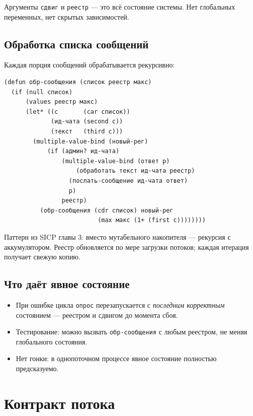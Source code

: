 \documentclass[11pt,a4paper]{article}
\begin{document}
Аргументы \texttt{сдвиг} и \texttt{реестр} — это всё состояние системы. Нет глобальных переменных, нет скрытых зависимостей.

\subsection{Обработка списка сообщений}

Каждая порция сообщений обрабатывается рекурсивно:

\begin{lstlisting}[caption={подмастерье/main.lisp — обработка с накоплением}]
(defun обр-сообщения (список реестр макс)
  (if (null список)
      (values реестр макс)
      (let* ((с       (car список))
             (ид-чата (second с))
             (текст   (third с)))
        (multiple-value-bind (новый-рег)
            (if (админ? ид-чата)
                (multiple-value-bind (ответ р)
                    (обработать текст ид-чата реестр)
                  (послать-сообщение ид-чата ответ)
                  р)
                реестр)
          (обр-сообщения (cdr список) новый-рег
                          (max макс (1+ (first с))))))))
\end{lstlisting}

Паттерн из SICP главы 3: вместо мутабельного накопителя — рекурсия с аккумулятором. Реестр обновляется по мере загрузки потоков; каждая итерация получает свежую копию.

\subsection{Что даёт явное состояние}

\begin{itemize}[noitemsep]
  \item При ошибке цикла \texttt{опрос} перезапускается с \textit{последним корректным} состоянием — реестром и сдвигом до момента сбоя.
  \item Тестирование: можно вызвать \texttt{обр-сообщения} с любым реестром, не меняя глобального состояния.
  \item Нет гонки: в однопоточном процессе явное состояние полностью предсказуемо.
\end{itemize}

\section{Контракт потока}
\label{sec:contract}
\end{document}
